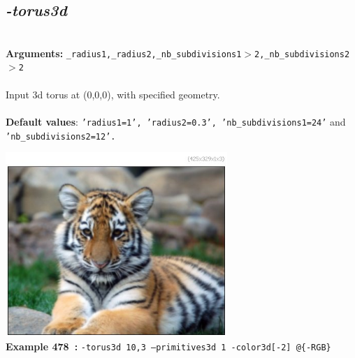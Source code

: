 \documentclass[a4paper,11pt,twoside]{book}
\begin{document}
\subsection{\emph{-torus3d} }\vspace*{-0.5em}
~\\\textbf{Arguments: } 
{\small \texttt{\_radius1,\_radius2,\_nb\_subdivisions1$>$2,\_nb\_subdivisions2$>$2}}\\~\\
Input 3d torus at (0,0,0), with specified geometry.
~\\~\\\textbf{Default values}: {\small \texttt{'radius1=1', 'radius2=0.3', 'nb\_subdivisions1=24'} and \texttt{'nb\_subdivisions2=12'.}}
\begin{center}\includegraphics[keepaspectratio=true,height=7cm,width=\textwidth]{img/gmic_def478.jpg}\\
{\footnotesize \textbf{Example 478~:} \texttt{-torus3d 10,3 --primitives3d 1 -color3d[-2] @\{-RGB\}}}
\end{center}
\end{document}
